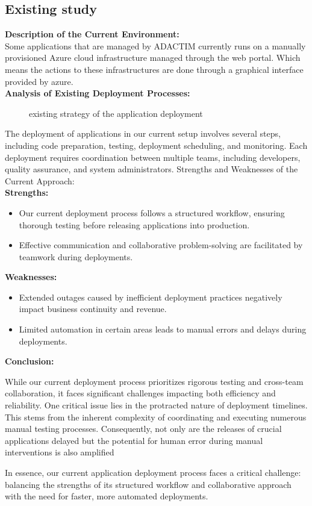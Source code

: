 \subsection{Existing study}
\noindent
\textbf{Description of the Current Environment:}
\\
Some applications that are managed by ADACTIM currently runs on a manually provisioned Azure cloud infrastructure managed through the web portal. Which means the actions to these infrastructures are done through a graphical interface provided by azure.
\\
\textbf{Analysis of Existing Deployment Processes:}

\begin{figure}[htpb]
    \centering
    \caption{existing strategy of the application deployment}
    \label{fig:existing_strategy}
\end{figure}

The deployment of applications in our current setup involves several steps, including code preparation, testing, deployment scheduling, and monitoring. Each deployment requires coordination between multiple teams, including developers, quality assurance, and system administrators.
Strengths and Weaknesses of the Current Approach:
\\
\textbf{Strengths:}
\begin{itemize}
    \item Our current deployment process follows a structured workflow, ensuring thorough testing before releasing applications into production.
    \item Effective communication and collaborative problem-solving are facilitated by teamwork during deployments.
\end{itemize}
\textbf{Weaknesses:}
\begin{itemize}
    \item Extended outages caused by inefficient deployment practices negatively impact business continuity and revenue.
    \item Limited automation in certain areas leads to manual errors and delays during deployments.
\end{itemize}
\noindent
\textbf{Conclusion:}
\par
While our current deployment process prioritizes rigorous testing and cross-team collaboration, it faces significant challenges impacting both efficiency and reliability. One critical issue lies in the protracted nature of deployment timelines. This stems from the inherent complexity of coordinating and executing numerous manual testing processes. Consequently, not only are the releases of crucial applications delayed but the potential for human error during manual interventions is also amplified
\par
In essence, our current application deployment process faces a critical challenge: balancing the strengths of its structured workflow and collaborative approach with the need for faster, more automated deployments.

